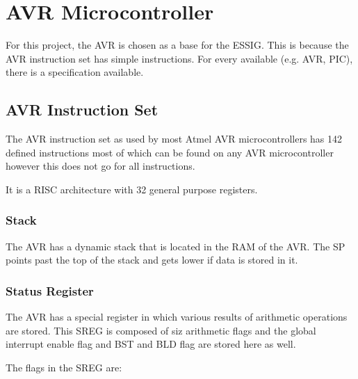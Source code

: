 \chapter{AVR Microcontroller}
For this project, the AVR \UC is chosen as a base for the \ac{ESSIG}. This
is because the AVR instruction set has simple instructions. For every \UC
available (e.g. AVR, PIC), there is a specification available.
 
%

\section{AVR Instruction Set}

The AVR instruction set as used by most Atmel AVR microcontrollers has 142 
defined instructions most of which can be found on any AVR microcontroller 
however this does not go for all instructions.

It is a RISC architecture with 32 general purpose registers. 

\subsection{Stack}

The AVR has a dynamic stack that is located in the RAM of the AVR.
The \ac{SP} points past the top of the stack and gets lower if data is 
stored in it.

\subsection{Status Register}

The AVR has a special register in which various results of arithmetic
operations are stored. This \ac{SREG} is composed of siz arithmetic
flags and the global interrupt enable flag and BST and BLD flag are 
stored here as well.

The flags in the \ac{SREG} are:

